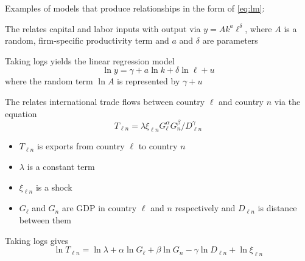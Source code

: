\begin{frame}
    
    \vspace{2em}
    Examples of models that produce relationships in the form of
    \eqref{eq:lm}:
    
    \vspace{.7em}
    \Eg
        \label{eg:cdprod}
        The  relates capital
        and labor inputs with
        output via $y = A k^a \ell^{\delta}$, where $A$ is a random,
        firm-specific productivity term and $a$ and $\delta$ are parameters
        
        Taking logs yields the linear regression model
        \begin{equation*}
            \ln y = \gamma + a \ln k + \delta \ln \ell + u
        \end{equation*}
        where the random term $\ln A$ is represented by $\gamma + u$
\end{frame}

\begin{frame}

    \vspace{2em}
    \Eg
    The  relates international trade flows
    between country $\ell$ and country $n$ via the 
    equation $$T_{\ell n} = \lambda \xi_{\ell n} G_\ell^{\alpha} G_n^\beta
    /D_{\ell n}^{\gamma}$$
    
    \begin{itemize}
        \item $T_{\ell n}$ is exports from country
    $\ell$ to country $n$
        \item  $\lambda$ is a constant term
        \item $\xi_{\ell n}$ is a
                shock
        \item $G_\ell$ and $G_n$ are GDP in country 
                $\ell$  and $n$ respectively and $D_{\ell n}$ is 
                distance between them
    \end{itemize}
    
    \vspace{.7em}
    Taking logs gives
    \begin{equation}
        \label{eq:gravity}
        \ln T_{\ell n} 
        = \ln \lambda 
        +  \alpha \ln G_\ell + \beta \ln G_n - \gamma \ln D_{\ell n}
        + \ln \xi_{\ell n}
    \end{equation}

\end{frame}

